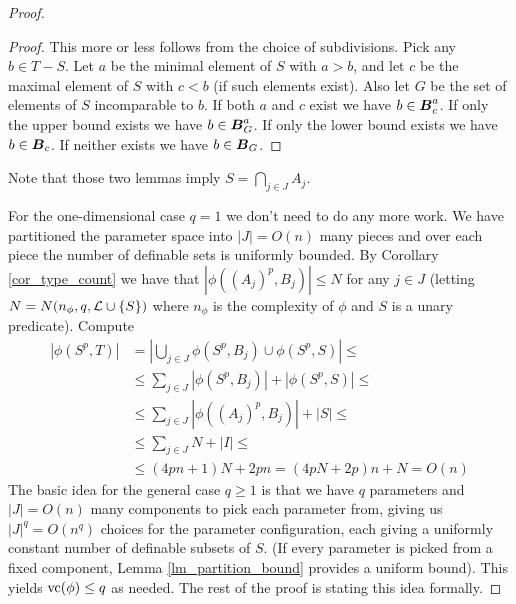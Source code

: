 \begin{proof}
  \begin{proof}
    This more or less follows from the choice of subdivisions. Pick any $b \in T - S$.
    Let $a$ be the minimal element of $S$ with $a > b$, and let $c$ be the maximal element of $S$ with $c < b$ (if such elements exist).
    Also let $G$ be the set of elements of $S$ incomparable to $b$.
    If both $a$ and $c$ exist we have $b \in \operatorname{\boldsymbol B}^a_c$. If only the upper bound exists we have $b \in \operatorname{\boldsymbol B}^a_G$. If only the lower bound exists we have $b \in \operatorname{\boldsymbol B}_c$. If neither exists we have $b \in \operatorname{\boldsymbol B}_G$.
  \end{proof}
  Note that those two lemmas imply $S = \bigcap_{j \in J} A_j$.
  
  For the one-dimensional case $q = 1$ we don't need to do any more work. We have partitioned the parameter space into $|J| = O(n)$ many pieces and over each piece the number of definable sets is uniformly bounded. By Corollary \ref{cor_type_count} we have that $|\phi((A_j)^p, B_j)| \leq N$ for any $j \in J$ (letting $N = N(n_\phi, q, \mathcal L \cup \{S\})$ where $n_\phi$ is the complexity of $\phi$ and $S$ is a unary predicate). Compute
  \begin{align*}
    |\phi(S^p, T)|
    &= \left|\bigcup_{j \in J} \phi(S^p, B_j) \cup \phi(S^p, S)\right| \leq \\
    &\leq \sum_{j \in J} |\phi(S^p, B_j)| + |\phi(S^p, S)| \leq \\
    &\leq \sum_{j \in J} |\phi((A_j)^p, B_j)| + |S| \leq \\
    &\leq \sum_{j \in J}N + |I| \leq \\
    &\leq (4pn + 1)N + 2pn = (4pN + 2p)n + N = O(n)
  \end{align*}
  The basic idea for the general case $q \geq 1$ is that we have $q$ parameters and $|J| = O(n)$ many components to pick each parameter from, giving us $|J|^q = O(n^q)$ choices for the parameter configuration, each giving a uniformly constant number of definable subsets of $S$. (If every parameter is picked from a fixed component, Lemma \ref{lm_partition_bound} provides a uniform bound). This yields $\operatorname{vc}(\phi) \leq q$ as needed. The rest of the proof is stating this idea formally.
  

\end{proof}
